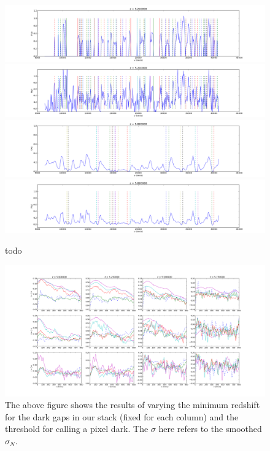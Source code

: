 \documentclass[11pt]{article}
\begin{document}
\begin{figure}[h]
  \centering
  \includegraphics[width=18cm]{sflux_panel3.png}
  \includegraphics[width=18cm]{flux_panel3.png}
  \includegraphics[width=18cm]{sflux_panel4.png}
  \includegraphics[width=18cm]{flux_panel4.png}
  \caption{todo}
  \label{fig:todo}
\end{figure}


\begin{figure}[h]
  \includegraphics[width=18cm,left]{gridPlot.png}
  \caption{The above figure shows the results of varying the minimum redshift for the dark gaps in our stack (fixed for each column) and the threshold for calling a pixel dark. The $\sigma$ here refers to the smoothed $\sigma_{N}$.}
  \label{fig:gridPlot}
\end{figure}
\end{document}

